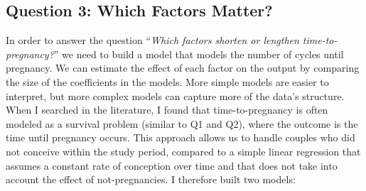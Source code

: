 \documentclass[11pt,a4paper]{article}
\begin{document}
\subsection{Question 3: Which Factors Matter?}
In order to answer the question “\emph{Which factors shorten or lengthen time-to-pregnancy?}” we need to build a model that models the number of cycles until pregnancy. We can estimate the effect of each factor on the output by comparing the size of the coefficients in the models.
More simple models are easier to interpret, but more complex models can capture more of the data's structure. When I searched in the literature, I found that time-to-pregnancy is often modeled as a survival problem (similar to Q1 and Q2), where the outcome is the time until pregnancy occurs. This approach allows us to handle couples who did not conceive within the study period, compared to a simple linear regression that assumes a constant rate of conception over time and that does not take into account the effect of not-pregnancies. 
I therefore built two models:
\end{document}
